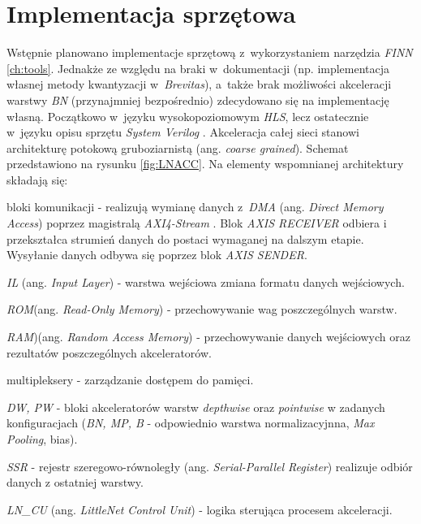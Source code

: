 \section{Implementacja sprzętowa}

Wstępnie planowano implementacje sprzętową z~wykorzystaniem narzędzia \emph{FINN} \ref{ch:tools}.
Jednakże ze względu na braki w~dokumentacji (np. implementacja własnej metody kwantyzacji w~\emph{Brevitas}), a~także brak możliwości akceleracji warstwy \emph{BN} (przynajmniej bezpośrednio) zdecydowano się na implementację własną.
Początkowo w~języku wysokopoziomowym \emph{HLS}, lecz ostatecznie w~języku opisu sprzętu \emph{System Verilog}
.
Akceleracja całej sieci stanowi architekturę potokową gruboziarnistą (ang. \emph{coarse grained}).
Schemat przedstawiono na rysunku \ref{fig:LNACC}.
Na elementy wspomnianej architektury składają się:
\begin{description}
\item  bloki komunikacji - realizują wymianę danych z~\emph{DMA} (ang. \emph{Direct Memory Access}) \cite{dma} poprzez magistralą \emph{AXI4-Stream} \cite{axis}. 
Blok \emph{AXIS RECEIVER} odbiera i przekształca strumień danych do postaci wymaganej na dalszym etapie. Wysyłanie danych odbywa się poprzez blok \emph{AXIS SENDER}.
\item \emph{IL} (ang. \emph{Input Layer}) - warstwa wejściowa zmiana formatu danych wejściowych.
\item \emph{ROM}(ang. \emph{Read-Only Memory}) - przechowywanie wag poszczególnych warstw.
\item \emph{RAM})(ang. \emph{Random Access Memory}) - przechowywanie danych wejściowych oraz rezultatów poszczególnych akceleratorów.
\item multipleksery - zarządzanie dostępem do pamięci.
\item \emph{DW, PW} - bloki akceleratorów warstw \emph{depthwise} oraz \emph{pointwise} w zadanych konfiguracjach (\emph{BN, MP, B} - odpowiednio warstwa normalizacyjnna, \emph{Max Pooling}, bias).
\item \emph{SSR} - rejestr szeregowo-równoległy (ang. \emph{Serial-Parallel Register}) realizuje odbiór danych z ostatniej warstwy.
\item \emph{LN\_CU} (ang. \emph{LittleNet Control Unit}) -  logika sterująca procesem akceleracji.
\end{description}


